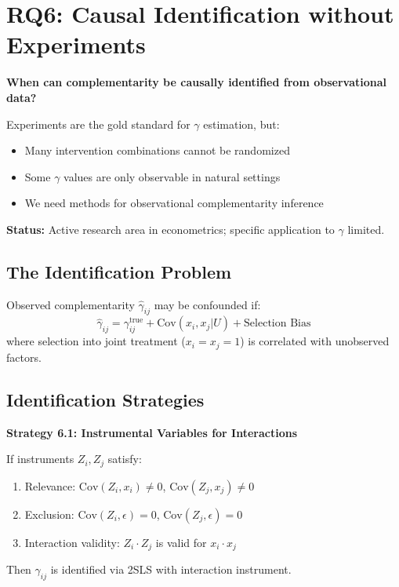 \section{RQ6: Causal Identification without Experiments}
\label{sec:rq6-identification}

\begin{tcolorbox}[colback=red!5!white,colframe=red!75!black,title=\textbf{Research Question 6}]
\textbf{When can complementarity be causally identified from observational data?}

Experiments are the gold standard for $\gamma$ estimation, but:
\begin{itemize}[noitemsep]
    \item Many intervention combinations cannot be randomized
    \item Some $\gamma$ values are only observable in natural settings
    \item We need methods for observational complementarity inference
\end{itemize}

\textbf{Status:} Active research area in econometrics; specific application to $\gamma$ limited.
\end{tcolorbox}

\subsection{The Identification Problem}

\begin{definition}
Observed complementarity $\hat{\gamma}_{ij}$ may be confounded if:
\begin{equation}
\hat{\gamma}_{ij} = \gamma_{ij}^{\text{true}} + \text{Cov}(x_i, x_j | U) + \text{Selection Bias}
\end{equation}
where selection into joint treatment ($x_i = x_j = 1$) is correlated with unobserved factors.
\end{definition}

\subsection{Identification Strategies}

\textbf{Strategy 6.1: Instrumental Variables for Interactions}

\begin{theorem}
If instruments $Z_i, Z_j$ satisfy:
\begin{enumerate}
    \item Relevance: $\text{Cov}(Z_i, x_i) \neq 0$, $\text{Cov}(Z_j, x_j) \neq 0$
    \item Exclusion: $\text{Cov}(Z_i, \epsilon) = 0$, $\text{Cov}(Z_j, \epsilon) = 0$
    \item Interaction validity: $Z_i \cdot Z_j$ is valid for $x_i \cdot x_j$
\end{enumerate}
Then $\gamma_{ij}$ is identified via 2SLS with interaction instrument.
\end{theorem}

